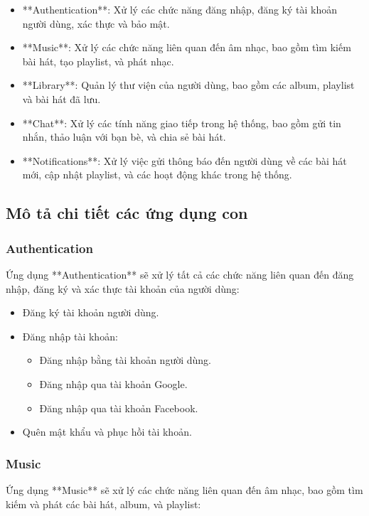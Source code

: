 \documentclass[a4paper]{article}
\begin{document}
\begin{itemize}
    \item **Authentication**: Xử lý các chức năng đăng nhập, đăng ký tài khoản người dùng, xác thực và bảo mật.
    \item **Music**: Xử lý các chức năng liên quan đến âm nhạc, bao gồm tìm kiếm bài hát, tạo playlist, và phát nhạc.
    \item **Library**: Quản lý thư viện của người dùng, bao gồm các album, playlist và bài hát đã lưu.
    \item **Chat**: Xử lý các tính năng giao tiếp trong hệ thống, bao gồm gửi tin nhắn, thảo luận với bạn bè, và chia sẻ bài hát.
    \item **Notifications**: Xử lý việc gửi thông báo đến người dùng về các bài hát mới, cập nhật playlist, và các hoạt động khác trong hệ thống.
\end{itemize}

\subsection{Mô tả chi tiết các ứng dụng con}

\subsubsection{Authentication}
Ứng dụng **Authentication** sẽ xử lý tất cả các chức năng liên quan đến đăng nhập, đăng ký và xác thực tài khoản của người dùng:

\begin{itemize}
    \item Đăng ký tài khoản người dùng.
    \item Đăng nhập tài khoản:
    \begin{itemize}
        \item Đăng nhập bằng tài khoản người dùng.
        \item Đăng nhập qua tài khoản Google.
        \item Đăng nhập qua tài khoản Facebook.
    \end{itemize}
    \item Quên mật khẩu và phục hồi tài khoản.
\end{itemize}

\subsubsection{Music}
Ứng dụng **Music** sẽ xử lý các chức năng liên quan đến âm nhạc, bao gồm tìm kiếm và phát các bài hát, album, và playlist:
\end{document}
